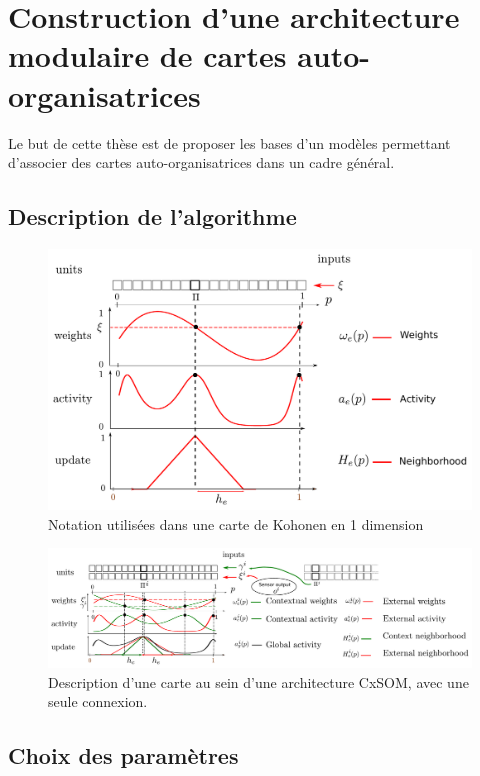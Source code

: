 \chapter{Construction d'une architecture modulaire de cartes auto-organisatrices}
\graphicspath{{03-Algorithme/}}
Le but de cette thèse est de proposer les bases d'un modèles permettant d'associer des cartes auto-organisatrices dans un cadre général. 


\section{Description de l'algorithme}

\begin{figure}
\includegraphics[width=\textwidth]{one_map_one_layer.pdf}
\caption{Notation utilisées dans une carte de Kohonen en 1 dimension}
\label{fig:one_map_not}
\end{figure}


\begin{figure}
\includegraphics[width=\textwidth]{one_map.pdf}
\caption{Description d'une carte au sein d'une architecture CxSOM, avec une seule connexion.}
\label{fig:one_map}
\end{figure}


\section{Choix des paramètres}

